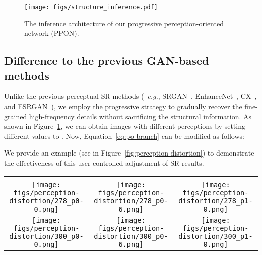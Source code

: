 \documentclass[preprint]{elsarticle}
\newcommand{\eg}{\textit{e.g.}}
\begin{document}
\begin{figure}[htpb]
	\begin{center}
		\texttt{[image: figs/structure\_inference.pdf]}
	\end{center}
	\caption{The inference architecture of our progressive perception-oriented network (PPON).}
	\label{fig:inference-architecture}
\end{figure}



\subsection{Difference to the previous GAN-based methods}
Unlike the previous perceptual SR methods (~\eg, SRGAN~\cite{SRGAN}, EnhanceNet~\cite{EnhanceNet}, CX~\cite{CX}, and ESRGAN~\cite{ESRGAN}), we employ the progressive strategy to gradually recover the fine-grained high-frequency details without sacrificing the structural information. As shown in Figure~\ref{fig:inference-architecture}, we can obtain images with different perceptions by setting different values to . Now, Equation~\ref{eq:po-branch} can be modified as follows:

We provide an example (see in Figure~\ref{fig:perception-distortion}) to demonstrate the effectiveness of this user-controlled adjustment of SR results.


\begin{figure*}[htpb]
	\centering
	\begin{tabular}{ccc}
		 &  &  \\		\texttt{[image: figs/perception-distortion/278\_p0-0.png]} &
		\hspace{-4mm}
		\texttt{[image: figs/perception-distortion/278\_p0-6.png]} &
		\hspace{-4mm}
		\texttt{[image: figs/perception-distortion/278\_p1-0.png]} \\
		
		\texttt{[image: figs/perception-distortion/300\_p0-0.png]} &
		\hspace{-4mm}
		\texttt{[image: figs/perception-distortion/300\_p0-6.png]} &
		\hspace{-4mm}
		\texttt{[image: figs/perception-distortion/300\_p1-0.png]} \\
		
	\end{tabular}
	\caption{The perception-distortion trade-off. In the first column,  directly denotes the outputs of SOBranch. Equally,  indicates the results (without any discount) of POBranch. \textbf{Best viewed with zoom-in.}}
	\label{fig:perception-distortion}
\end{figure*}
\end{document}
